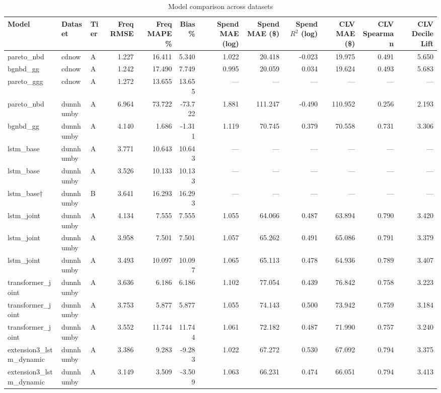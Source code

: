 \begin{table}
\caption{Model comparison across datasets}
\label{tab:model_comparison}
\begin{tabular}{lllrrrrrrrrr}
\toprule
Model & Dataset & Tier & Freq RMSE & Freq MAPE \% & Bias \% & Spend MAE (log) & Spend MAE (\$) & Spend $R^2$ (log) & CLV MAE (\$) & CLV Spearman & CLV Decile Lift \\
\midrule
pareto_nbd & cdnow & A & 1.227 & 16.411 & 5.340 & 1.022 & 20.418 & -0.023 & 19.975 & 0.491 & 5.650 \\
bgnbd_gg & cdnow & A & 1.242 & 17.490 & 7.749 & 0.995 & 20.059 & 0.034 & 19.624 & 0.493 & 5.683 \\
pareto_ggg & cdnow & A & 1.272 & 13.655 & 13.655 & — & — & — & — & — & — \\
pareto_nbd & dunnhumby & A & 6.964 & 73.722 & -73.722 & 1.881 & 111.247 & -0.490 & 110.952 & 0.256 & 2.193 \\
bgnbd_gg & dunnhumby & A & 4.140 & 1.686 & -1.311 & 1.119 & 70.745 & 0.379 & 70.558 & 0.731 & 3.306 \\
lstm_base & dunnhumby & A & 3.771 & 10.643 & 10.643 & — & — & — & — & — & — \\
lstm_base & dunnhumby & A & 3.526 & 10.133 & 10.133 & — & — & — & — & — & — \\
lstm_base† & dunnhumby & B & 3.641 & 16.293 & 16.293 & — & — & — & — & — & — \\
lstm_joint & dunnhumby & A & 4.134 & 7.555 & 7.555 & 1.055 & 64.066 & 0.487 & 63.894 & 0.790 & 3.420 \\
lstm_joint & dunnhumby & A & 3.958 & 7.501 & 7.501 & 1.057 & 65.262 & 0.491 & 65.086 & 0.791 & 3.379 \\
lstm_joint & dunnhumby & A & 3.493 & 10.097 & 10.097 & 1.065 & 65.113 & 0.478 & 64.936 & 0.789 & 3.407 \\
transformer_joint & dunnhumby & A & 3.636 & 6.186 & 6.186 & 1.102 & 77.054 & 0.439 & 76.842 & 0.758 & 3.223 \\
transformer_joint & dunnhumby & A & 3.753 & 5.877 & 5.877 & 1.055 & 74.143 & 0.500 & 73.942 & 0.759 & 3.184 \\
transformer_joint & dunnhumby & A & 3.552 & 11.744 & 11.744 & 1.061 & 72.182 & 0.487 & 71.990 & 0.757 & 3.240 \\
extension3_lstm_dynamic & dunnhumby & A & 3.386 & 9.283 & -9.283 & 1.022 & 67.272 & 0.530 & 67.092 & 0.794 & 3.375 \\
extension3_lstm_dynamic & dunnhumby & A & 3.149 & 3.509 & -3.509 & 1.063 & 66.231 & 0.474 & 66.051 & 0.794 & 3.413 \\

\end{tabular}
\end{table}
